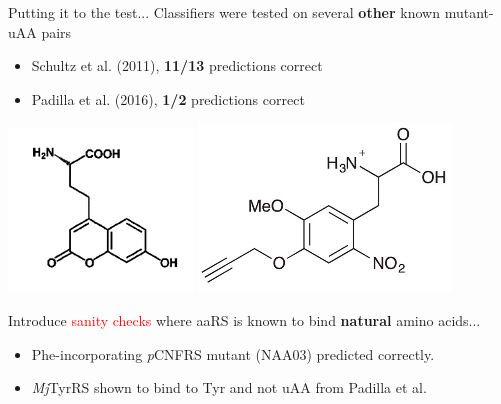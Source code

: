 \documentclass{beamer}
\begin{document}
\begin{frame}{Putting it to the test...}
    Classifiers were tested on several \textbf{other} known mutant-uAA pairs
    \begin{itemize}
        \item Schultz et al. (2011), \hfill\textbf{11/13} predictions correct\\
        \item Padilla et al. (2016), \hfill\textbf{1/2} predictions correct\\
    \end{itemize}
    
    \includegraphics[scale=0.5]{coumarin_UAA.png}\hfill
    \includegraphics[scale=0.4]{Padilla_UAA.png}
\end{frame}
\begin{frame}
Introduce \textcolor{red}{sanity checks} where aaRS is known to bind \textbf{natural} amino acids...
    \begin{itemize}
        \item Phe-incorporating \textit{p}CNFRS mutant (NAA03) predicted correctly.
        \item \textit{Mj}TyrRS shown to bind to Tyr and not uAA from Padilla et al.
    \end{itemize}
\end{frame}
\end{document}

